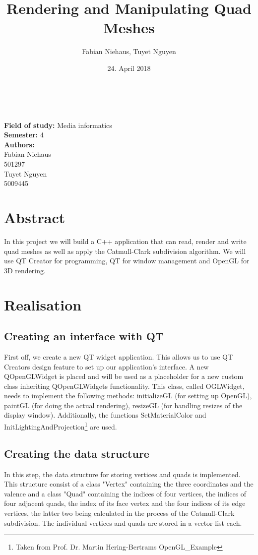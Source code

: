 \documentclass[12pt,a4paper]{scrartcl}
\title{Rendering and Manipulating Quad Meshes}
\author{Fabian Niehaus, Tuyet Nguyen}
\date{24. April 2018}
\begin{document}
\begin{titlepage}
	\centering
	\ \\[2cm]
	{\huge\textbf{\@title}} 
	\\[3cm]
	\large
	\textbf{Field of study:} Media informatics \\
	\textbf{Semester:} 4
	\\[3cm]
	\textbf {Authors:}
	\\Fabian Niehaus
	\\501297
	\\Tuyet Nguyen
	\\5009445
\end{titlepage}

\newpage
\setcounter{page}{0}
\tableofcontents

\newpage
\ofoot[]{\pagemark}
\normalsize

\section{Abstract}
In this project we will build a C++ application that can read, render and write quad meshes as well as apply the Catmull-Clark subdivision algorithm. We will use QT Creator for programming, QT for window management and OpenGL for 3D rendering.

\section{Realisation}

\subsection{Creating an interface with QT}
First off, we create a new QT widget application. This allows us to use QT Creators design feature to set up our application's interface. A new QOpenGLWidget is placed and will be used as a placeholder for a new custom class inheriting QOpenGLWidgets functionality. This class, called OGLWidget, needs to implement the following methods: initializeGL (for setting up OpenGL), paintGL (for doing the actual rendering), resizeGL (for handling resizes of the display window). Additionally, the functions SetMaterialColor and InitLightingAndProjection\footnote{Taken from Prof. Dr. Martin Hering-Bertrams OpenGL_Example} are used.

\subsection{Creating the data structure}
In this step, the data structure for storing vertices and quads is implemented. This structure consist of a class "Vertex" containing the three coordinates and the valence and a class "Quad" containing the indices of four vertices, the indices of four adjacent quads, the index of its face vertex and the four indices of its edge vertices, the latter two being calculated in the process of the Catmull-Clark subdivision. The individual vertices and quads are stored in a vector list each.
\end{document}
